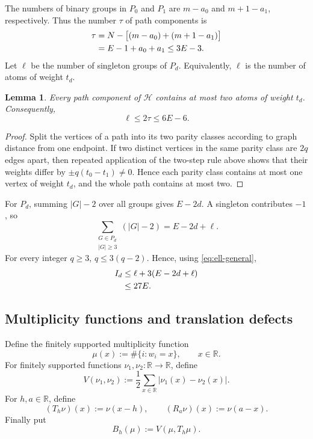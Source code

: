 \documentclass[11pt]{article}
\newtheorem{lemma}[theorem]{Lemma}
\theoremstyle{definition}
\newcommand{\R}{\mathbb{R}}
\newcommand{\1}{\mathbf{1}}
\begin{document}
The numbers of binary groups in $P_0$ and $P_1$ are $m-a_0$ and $m+1-a_1$, respectively.  Thus the number $\tau$ of path components is
\begin{align}
  \tau
  &=N-\bigl[(m-a_0)+(m+1-a_1)\bigr]\notag\\
  &=E-1+a_0+a_1
  \le3E-3.\label{eq:tau}
\end{align}
Let $\ell$ be the number of singleton groups of $P_d$.  Equivalently, $\ell$ is the number of atoms of weight $t_d$.

\begin{lemma}\label{lem:two-final-singletons}
Every path component of $\mathcal H$ contains at most two atoms of weight $t_d$.  Consequently,
\begin{equation}\label{eq:ell-general}
  \ell\le2\tau\le6E-6.
\end{equation}
\end{lemma}

\begin{proof}
Split the vertices of a path into its two parity classes according to graph distance from one endpoint.  If two distinct vertices in the same parity class are $2q$ edges apart, then repeated application of the two-step rule above shows that their weights differ by $\pm q(t_0-t_1)\ne0$.  Hence each parity class contains at most one vertex of weight $t_d$, and the whole path contains at most two.
\end{proof}

For $P_d$, summing $|G|-2$ over all groups gives $E-2d$.  A singleton contributes $-1$, so
\begin{equation}\label{eq:high-final-deviation}
  \sum_{\substack{G\in P_d\\|G|\ge3}}(|G|-2)
  =E-2d+\ell.
\end{equation}
For every integer $q\ge3$, $q\le3(q-2)$.  Hence, using \eqref{eq:ell-general},
\begin{align}
  I_d
  &\le \ell+3(E-2d+\ell)\notag\\
  &\le 27E.\label{eq:Id-bound}
\end{align}

\subsection{Multiplicity functions and translation defects}

Define the finitely supported multiplicity function
\begin{equation}\label{eq:mu}
  \mu(x):=\#\{i:w_i=x\},\qquad x\in\R.
\end{equation}
For finitely supported functions $\nu_1,\nu_2:\R\to\R$, define
\begin{equation}\label{eq:V}
  V(\nu_1,\nu_2):=\frac12\sum_{x\in\R}|\nu_1(x)-\nu_2(x)|.
\end{equation}
For $h,a\in\R$, define
\begin{equation}\label{eq:operators}
  (T_h\nu)(x):=\nu(x-h),
  \qquad
  (R_a\nu)(x):=\nu(a-x).
\end{equation}
Finally put
\begin{equation}\label{eq:Bh}
  B_h(\mu):=V(\mu,T_h\mu).
\end{equation}
\end{document}
